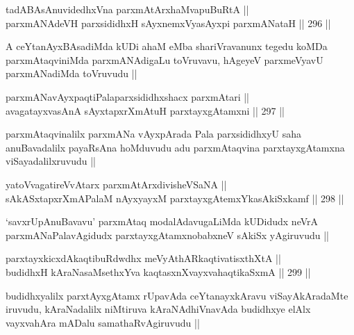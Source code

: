 
\begin{shl}
tadABAsAnuvidedhxVna parxmAtArx\s haMvapuBuRtA || \\
parxmANAdeVH parxsididhxH sAyxnemxVyasAyxpi parxmANataH ||  296 ||  
\end{shl}

\begin{artha}
A ceYtanAyxBAsadiMda kUDi ahaM eMba shariVravanunx tegedu koMDa parxmAtaqviniMda parxmANAdigaLu toVruvavu, hAgeyeV parxmeVyavU parxmANadiMda toVruvudu ||
\end{artha}


\begin{shl}
parxmANavAyxpaqtiPalaparxsididhxshacx parxmAtari || \\
avagatayxvasAnA sAyxtapxrXmAtuH parxtayxgAtamxni ||  297 ||  
\end{shl}

\begin{artha}
parxmAtaqvinalilx parxmANa vAyxpArada Pala parxsididhxyU saha anuBavadalilx payaRsAna hoMduvudu adu parxmAtaqvina parxtayxgAtamxna viSayadalilxruvudu ||
\end{artha}

\begin{shl}
yatoV\s vagatireVvAtarx parxmAtArxdivisheVSaNA || \\
sAkASxtapxrXmAPalaM nAyxyayxM parxtayxgAtemxYkasAkiSxkamf ||  298 ||  
\end{shl}

\begin{artha}
`savxrUpAnuBavavu' parxmAtaq modalAdavugaLiMda kUDidudx neVrA parxmANaPalavAgidudx parxtayxgAtamxnobabxneV sAkiSx yAgiruvudu ||
\end{artha}

\begin{shl}
parxtayxkicxdAkaqtibuRdwdhx meVyAthARkaqtivatisxthXtA || \\
budidhxH kAraNasaMsethxYva kaqtasxnXvayxvahaqtikaSxmA ||  299 ||  
\end{shl}

\begin{artha}
budidhxyalilx parxtAyxgAtamx rUpavAda ceYtanayxkAravu viSayAkAradaMte iruvudu, kAraNadalilx niMtiruva kAraNAdhiVnavAda budidhxye elAlx vayxvahAra mADalu samathaRvAgiruvudu ||
\end{artha}

